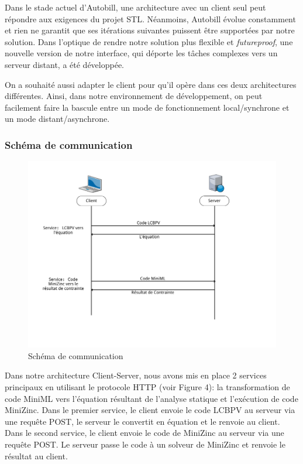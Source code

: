 \documentclass[12pt]{article}
\begin{document}
Dans le stade actuel d'Autobill, une architecture avec un client seul
peut répondre aux exigences du projet STL. Néanmoins, Autobill évolue
constamment et rien ne garantit que ses itérations suivantes puissent
être supportées par notre solution. Dans l'optique de rendre notre
solution plus flexible et \emph{futureproof}, une nouvelle version de
notre interface, qui déporte les tâches complexes vers un serveur
distant, a été développée.

On a souhaité aussi adapter le client pour qu'il opère dans ces deux
architectures différentes. Ainsi, dans notre environnement de
développement, on peut facilement faire la bascule entre un mode de
fonctionnement local/synchrone et un mode distant/asynchrone.

\hypertarget{schuxe9ma-de-communication}{%
  \subsubsection{Schéma de
    communication}\label{schuxe9ma-de-communication}}

\begin{figure}
  \centering
  \includegraphics{Figures/Communication.png}
  \caption{Schéma de communication}
\end{figure}

\newpage

Dans notre architecture Client-Server, nous avons mis en place 2
services principaux en utilisant le protocole HTTP (voir Figure 4): la
transformation de code MiniML vers l'équation résultant de l'analyse
statique et l'exécution de code MiniZinc. Dans le premier service, le
client envoie le code LCBPV au serveur via une requête POST, le serveur
le convertit en équation et le renvoie au client. Dans le second
service, le client envoie le code de MiniZinc au serveur via une requête
POST. Le serveur passe le code à un solveur de MiniZinc et renvoie le
résultat au client.
\end{document}
